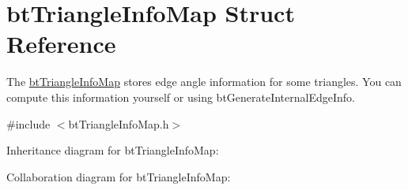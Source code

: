 \hypertarget{structbt_triangle_info_map}{\section{bt\+Triangle\+Info\+Map Struct Reference}
\label{structbt_triangle_info_map}
}


The \hyperlink{structbt_triangle_info_map}{bt\+Triangle\+Info\+Map} stores edge angle information for some triangles. You can compute this information yourself or using bt\+Generate\+Internal\+Edge\+Info.  




{\ttfamily \#include $<$bt\+Triangle\+Info\+Map.\+h$>$}



Inheritance diagram for bt\+Triangle\+Info\+Map\+:


Collaboration diagram for bt\+Triangle\+Info\+Map\+:
